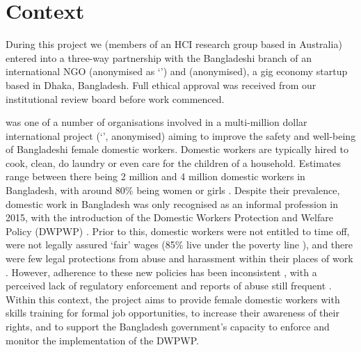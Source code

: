 \section{Context}

During this project we (members of an HCI research group based in Australia) entered into a three-way partnership with the Bangladeshi branch of an international NGO (anonymised as `\NGO{}') and \PC{} (anonymised), a gig economy startup based in Dhaka, Bangladesh. Full ethical approval was received from our institutional review board before work commenced.

\NGO{} was one of a number of organisations involved in a multi-million dollar international project (`\SRP{}', anonymised) aiming to improve the safety and well-being of Bangladeshi female domestic workers. Domestic workers are typically hired to cook, clean, do laundry or even care for the children of a household. Estimates range between there being 2 million \cite{DWRN2011} and 4 million \cite{Ashraf2019} domestic workers in Bangladesh, with around 80\% being women or girls \cite{Ashraf2019}. Despite their prevalence, domestic work in Bangladesh was only recognised as an informal profession in 2015, with the introduction of the Domestic Workers Protection and Welfare Policy (DWPWP) \cite{Islam2017}. Prior to this, domestic workers were not entitled to time off, were not legally assured `fair' wages (85\% live under the poverty line \cite{BILS2015}), and there were few legal protections from abuse and harassment within their places of work \cite{IDWF2015}. However, adherence to these new policies has been inconsistent \cite{islam2016}, with a perceived lack of regulatory enforcement and reports of abuse still frequent \cite{DailyStar2018}. Within this context, the \SRP{} project aims to provide female domestic workers with skills training for formal job opportunities, to increase their awareness of their rights, and to support the Bangladesh government's capacity to enforce and monitor the implementation of the DWPWP. 

